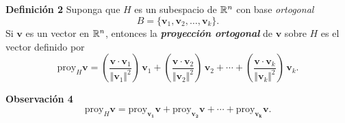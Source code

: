 
\subsection{}

\begin{frame}%

\begin{defi}{\textbf{Definición 2}}
	\justifying
	Suponga que $H$ es un subespacio de $\mathbb{R}^n$ con base \textit{ortogonal} 
	\[
		B = \{ \mathbf{v}_1, \mathbf{v}_2, \hdots, \mathbf{v}_k\}.
	\]
	Si $\mathbf{v}$ es un vector en $\mathbb{R}^n$, entonces la \textbf{\textit{proyección ortogonal}} de $\mathbf{v}$ sobre $H$
	es el vector definido por
	\[
		\text{proy}_H \mathbf{v} = \left( \frac{\mathbf{v}\cdot \mathbf{v}_1}{\Vert \mathbf{v}_1 \Vert^2} \right)\, \mathbf{v}_1 + 
		\left( \frac{\mathbf{v}\cdot \mathbf{v}_2}{\Vert \mathbf{v}_2 \Vert^2} \right)\, \mathbf{v}_2 + \cdots 
		+ \left( \frac{\mathbf{v}\cdot \mathbf{v}_k}{\Vert \mathbf{v}_k \Vert^2} \right)\, \mathbf{v}_k.
	\]
	
	\vspace{-1mm}
\end{defi}	

	\begin{alertblock}{\textbf{Observación 4}}
	\[
		\text{proy}_H \mathbf{v} = \text{proy}_{\mathbf{v_1}} \mathbf{v} + \text{proy}_{\mathbf{v_2}} \mathbf{v} + \cdots +
		\text{proy}_{\mathbf{v_k}} \mathbf{v}. 
	\]
\end{alertblock}

\end{frame}


\subsection{}

